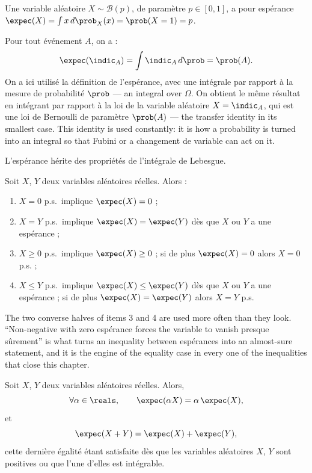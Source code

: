\begin{example}
  Une variable aléatoire $X \sim \mathcal{B}(p)$, de paramètre $p \in [0,1]$, a
  pour espérance $\expec(X) = \int x\,d\prob_{X}(x) = \prob(X=1) = p$.
\end{example}

\begin{example}
  Pour tout événement $A$, on a :
  \[
    \expec(\indic_{A}) = \int \indic_{A}\,d\prob = \prob(A).
  \]
  On a ici utilisé la définition de l'espérance, avec une intégrale par rapport à
  la mesure de probabilité $\prob$ --- an integral over $\Omega$. On obtient le
  même résultat en intégrant par rapport à la loi de la variable aléatoire
  $X=\indic_{A}$, qui est une loi de Bernoulli de paramètre $\prob(A)$ --- the
  transfer identity in its smallest case. This identity is used constantly: it is
  how a probability is turned into an integral so that Fubini or a changement de
  variable can act on it.
\end{example}

L'espérance hérite des propriétés de l'intégrale de Lebesgue.

\begin{theorem}
  Soit $X$, $Y$ deux variables aléatoires réelles. Alors :
  \begin{enumerate}
    \item $X = 0$ p.s.\ implique $\expec(X)=0$ ;
    \item $X = Y$ p.s.\ implique $\expec(X)=\expec(Y)$ dès que $X$ ou $Y$ a une
      espérance ;
    \item $X \geq 0$ p.s.\ implique $\expec(X) \geq 0$ ; si de plus
      $\expec(X)=0$ alors $X = 0$ p.s. ;
    \item $X \leq Y$ p.s.\ implique $\expec(X) \leq \expec(Y)$ dès que $X$ ou
      $Y$ a une espérance ; si de plus $\expec(X)=\expec(Y)$ alors
      $X = Y$ p.s.
  \end{enumerate}
\end{theorem}

The two converse halves of items 3 and 4 are used more often than they look.
``Non-negative with zero espérance forces the variable to vanish presque
sûrement'' is what turns an inequality between espérances into an almost-sure
statement, and it is the engine of the equality case in every one of the
inequalities that close this chapter.

\begin{theorem}[Linéarité]
  Soit $X$, $Y$ deux variables aléatoires réelles. Alors,
  \[
    \forall \alpha \in \reals, \qquad \expec(\alpha X) = \alpha\,\expec(X),
  \]
  et
  \[
    \expec(X+Y) = \expec(X) + \expec(Y),
  \]
  cette dernière égalité étant satisfaite dès que les variables aléatoires $X$,
  $Y$ sont positives ou que l'une d'elles est intégrable.
\end{theorem}

